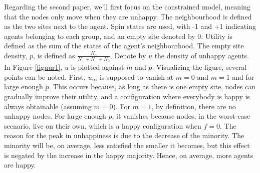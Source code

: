 Regarding the second paper, we'll first focus on the constrained model, meaning that the nodes only move when they are unhappy. The neighbourhood is defined as the two sites next to the agent. Spin states are used, with -1 and +1 indicating agents belonging to each group, and an empty site denoted by 0. Utility is defined as the sum of the states of the agent's neighbourhood. The empty site density, $p$, is defined as $\frac{N_0}{N_+ + N_- + N_0}$. Denote by $u$ the density of unhappy agents. In Figure \ref{figuur1}, $u$ is plotted against $m$ and $p$. Visualizing the figure, several points can be noted.
First, $u_\infty$ is supposed to vanish at $m=0$ and $m=1$ and for large enough $p$. This occurs because, as long as there is one empty site, nodes can gradually improve their utility, and a configuration where everybody is happy is always obtainable (assuming $m=0$). For $m=1$, by definition, there are no unhappy nodes. For large enough $p$, it vanishes because nodes, in the worst-case scenario, live on their own, which is a happy configuration when $f = 0$.
The reason for the peak in unhappiness is due to the decrease of the minority. The minority will be, on average, less satisfied the smaller it becomes, but this effect is negated by the increase in the happy majority. Hence, on average, more agents are happy.

